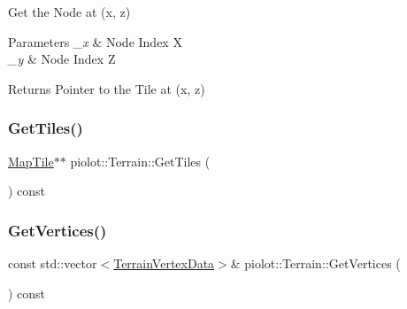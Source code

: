 Get the Node at (x, z) 


\begin{DoxyParams}{Parameters}
{\em \+\_\+x} & Node Index X \\
\hline
{\em \+\_\+y} & Node Index Z \\
\hline
\end{DoxyParams}
\begin{DoxyReturn}{Returns}
Pointer to the Tile at (x, z) 
\end{DoxyReturn}
\mbox{\label{classpiolot_1_1_terrain_a0366991939da62e46bff441c1b3988e0}} 
\subsubsection{\texorpdfstring{Get\+Tiles()}{GetTiles()}}
{\footnotesize\ttfamily \mbox{\hyperlink{classpiolot_1_1_map_tile}{Map\+Tile}}$\ast$$\ast$ piolot\+::\+Terrain\+::\+Get\+Tiles (\begin{DoxyParamCaption}{ }\end{DoxyParamCaption}) const\hspace{0.3cm}{\ttfamily [inline]}}

\mbox{\label{classpiolot_1_1_terrain_a0fe5987e17e76c418cc9407a1acdc915}} 
\subsubsection{\texorpdfstring{Get\+Vertices()}{GetVertices()}}
{\footnotesize\ttfamily const std\+::vector$<$\mbox{\hyperlink{structpiolot_1_1_terrain_vertex_data}{Terrain\+Vertex\+Data}}$>$\& piolot\+::\+Terrain\+::\+Get\+Vertices (\begin{DoxyParamCaption}{ }\end{DoxyParamCaption}) const\hspace{0.3cm}{\ttfamily [inline]}}

\mbox{\label{classpiolot_1_1_terrain_ae418fe0d7f2e8edef2edb01ed2312616}} 
